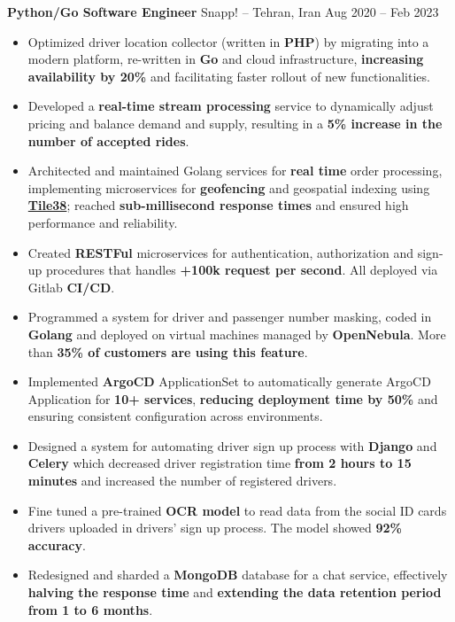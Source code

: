 \textbf{Python/Go Software Engineer} Snapp! -- Tehran, Iran \hfill Aug 2020 -- Feb 2023
\vspace{-10pt}
\begin{itemize}
      \item Optimized driver location collector (written in \textbf{PHP}) by migrating into a modern platform, re-written in \textbf{Go} and cloud infrastructure,
            \textbf{increasing availability by 20\%} and facilitating faster rollout of new functionalities.
      \item Developed a \textbf{real-time stream processing} service to dynamically adjust pricing and balance demand and supply,
            resulting in a \textbf{5\% increase in the number of accepted rides}.
      \item Architected and maintained Golang services for \textbf{real time} order processing, implementing microservices for \textbf{geofencing} and
            geospatial indexing using \href{https://tile38.com}{\textbf{Tile38}}; reached \textbf{sub-millisecond response times} and
            ensured high performance and reliability.
      \item Created \textbf{RESTFul} microservices for authentication, authorization and sign-up procedures that handles \textbf{+100k request per second}. All  deployed via Gitlab \textbf{CI/CD}.
      \item Programmed a system for driver and passenger number masking, coded in \textbf{Golang}
            and deployed on virtual machines managed by \textbf{OpenNebula}. More than \textbf{35\% of customers are using this feature}.
      \item Implemented \textbf{ArgoCD} ApplicationSet to automatically generate ArgoCD Application for \textbf{10+ services}, \textbf{reducing deployment time by 50\%} and ensuring consistent configuration across environments.
      \item Designed a system for automating driver sign up process with \textbf{Django} and \textbf{Celery} which decreased driver registration time \textbf{from 2 hours to 15 minutes} and increased the number of registered drivers.
      \item Fine tuned a pre-trained \textbf{OCR model} to read data from the social ID cards drivers uploaded in drivers' sign up process. The model showed \textbf{92\% accuracy}.
      \item Redesigned and sharded a \textbf{MongoDB} database for a chat service, effectively \textbf{halving the response time} and \textbf{extending the data retention period from 1 to 6 months}.
\end{itemize}

